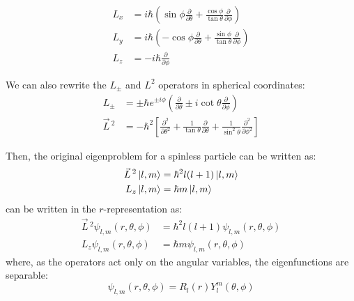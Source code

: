 \begin{equation}
    \begin{split}
        L_x &= i\hbar \left(\sin\phi\frac{\partial}{\partial\theta} + \frac{\cos\phi}{\tan\theta}\frac{\partial}{\partial\phi}\right) \\
        L_y &= i\hbar \left(-\cos\phi\frac{\partial}{\partial\theta} + \frac{\sin\phi}{\tan\theta}\frac{\partial}{\partial\phi}\right) \\
        L_z &= -i\hbar \frac{\partial}{\partial\phi}
    \end{split}
\end{equation}

We can also rewrite the $L_\pm$ and $L^2$ operators in spherical coordinates:
\begin{equation}
    \begin{split}
        L_\pm &= \pm\hbar e^{\pm i\phi}\left(\frac{\partial}{\partial\theta} \pm i\cot\theta\frac{\partial}{\partial\phi}\right) \\
        \vec{L}\,^2 &= -\hbar^2\left[\frac{\partial^2}{\partial \theta^2}+ \frac{1}{\tan \theta} \frac{\partial }{\partial \theta } + \frac{1}{\sin^2\theta}\frac{\partial^2}{\partial \phi^2}\right]
    \end{split}
\end{equation}

Then, the original eigenproblem for a spinless particle can be written as:
\begin{equation}
    \begin{split}
        \vec{L}\,^2\ket{l,m} &= \hbar^2l(l+1)\ket{l,m} \\
        L_z\ket{l,m} &= \hbar m\ket{l,m}
    \end{split}
\end{equation}
can be written in the $r$-representation as:
\begin{equation}
    \begin{split}
        \vec{L}\,^2\psi_{l,m} (r, \theta, \phi) &= \hbar^2l(l+1)\psi_{l,m} (r, \theta, \phi) \\
        L_z\psi_{l,m} (r, \theta, \phi) &= \hbar m\psi_{l,m} (r, \theta, \phi)
    \end{split}
\end{equation}
where, as the operators act only on the angular variables, the eigenfunctions are separable:
\begin{equation}
    \psi_{l,m} (r, \theta, \phi) = R_{l}(r)Y_l^m(\theta, \phi)
\end{equation}

